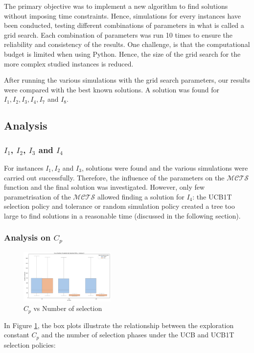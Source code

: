 \documentclass[conference]{IEEEtran}
\begin{document}
The primary objective was to implement a new algorithm to find solutions without imposing time constraints. Hence, simulations for every instances have been conducted, testing different combinations of parameters in what is called a grid search. Each combination of parameters was run 10 times to ensure the reliability and consistency of the results.
One challenge, is that the computational budget is limited when using Python. Hence, the size of the grid search for the more complex studied instances is reduced. 

After running the various simulations with the grid search parameters, our results were compared with the best known solutions. A solution was found for $I_1, I_2, I_3, I_4,I_7$ and $I_8$. 

\subsection{Analysis}
\subsubsection{$I_1$, $I_2$, $I_3$ and $I_4$}
For instances $I_1, I_2$ and $I_3$, solutions were found and the various simulations were carried out successfully. Therefore, the influence of the parameters on the $\mathcal{MCTS}$ function and the final solution was investigated.
However, only few parametrisation of the $\mathcal{MCTS}$ allowed finding a solution for $I_4$: the UCB1T selection policy and tolerance or random simulation policy created a tree too large to find solutions in a reasonable time (discussed in the following section).

\subsubsection*{Analysis on $C_p$}
\begin{figure}[!ht]
    \centering
    \includegraphics[width=0.42\textwidth]{Figures/3 - cp_vs_selection.png}
    \caption{$C_p$ vs Number of selection}
    \label{fig:cp_vs_selection_3}
\end{figure}

In Figure \ref{fig:cp_vs_selection_3}, the box plots illustrate the relationship between the exploration constant \( C_p \) and the number of selection phases under the UCB and UCB1T selection policies:
\end{document}
